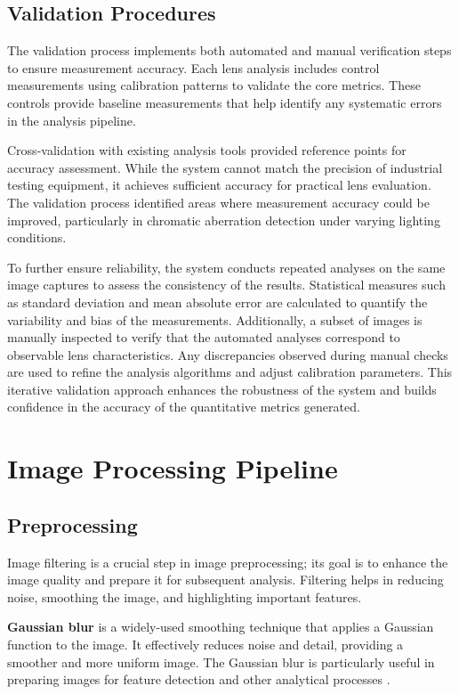 \subsection{Validation Procedures}
The validation process implements both automated and manual verification steps to ensure measurement accuracy. Each lens analysis includes control measurements using calibration patterns to validate the core metrics. These controls provide baseline measurements that help identify any systematic errors in the analysis pipeline.

Cross-validation with existing analysis tools provided reference points for accuracy assessment. While the system cannot match the precision of industrial testing equipment, it achieves sufficient accuracy for practical lens evaluation. The validation process identified areas where measurement accuracy could be improved, particularly in chromatic aberration detection under varying lighting conditions.

To further ensure reliability, the system conducts repeated analyses on the same image captures to assess the consistency of the results. Statistical measures such as standard deviation and mean absolute error are calculated to quantify the variability and bias of the measurements. Additionally, a subset of images is manually inspected to verify that the automated analyses correspond to observable lens characteristics. Any discrepancies observed during manual checks are used to refine the analysis algorithms and adjust calibration parameters. This iterative validation approach enhances the robustness of the system and builds confidence in the accuracy of the quantitative metrics generated.

\section{Image Processing Pipeline}

\subsection{Preprocessing}
Image filtering is a crucial step in image preprocessing; its goal is to enhance the image quality and prepare it for subsequent analysis. Filtering helps in reducing noise, smoothing the image, and highlighting important features.

\textbf{Gaussian blur} is a widely-used smoothing technique that applies a Gaussian function to the image. It effectively reduces noise and detail, providing a smoother and more uniform image. The Gaussian blur is particularly useful in preparing images for feature detection and other analytical processes \cite{gaussian}.

